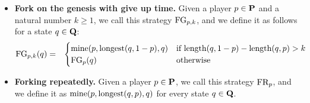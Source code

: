 \begin{itemize}

\item {\bf Fork on the genesis with give up time.} Given a player $p \in \mathbf{P}$ and a natural number $k \geq 1$, we call this strategy $\text{\rm FG}_{p,k}$, and we define it as follows for a state $q \in \mathbf{Q}$:
\begin{eqnarray*}
\text{\rm FG}_{p,k}(q) & = &
\begin{cases}
\text{\rm mine}(p,{\text{\rm longest}}(q,1-p),q) & \text{if } \text{\rm length}(q,1-p) - \text{\rm length}(q,p) > k\\
\text{\rm FG}_p(q) &   \text{otherwise}
\end{cases}
\end{eqnarray*}

\item {\bf Forking repeatedly.} Given a player $p \in \mathbf{P}$, we call this strategy $\text{\rm FR}_{p}$, and we define it as $\text{\rm mine}(p, {\text{\rm longest}}(q,p), q)$ for every state $q \in \mathbf{Q}$.


\end{itemize}
